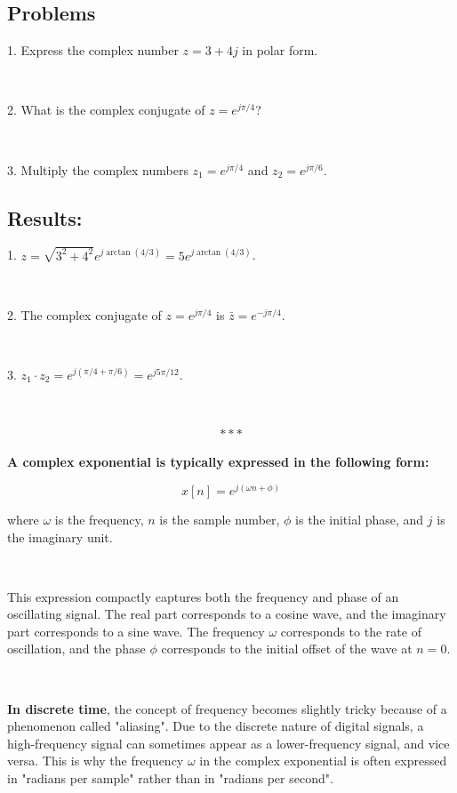 \documentclass[11pt]{article}
\begin{document}
\subsection*{Problems}

1. Express the complex number $z = 3 + 4j$ in polar form.

\ 


2. What is the complex conjugate of $z = e^{j\pi/4}$?

\ 

3. Multiply the complex numbers $z_1 = e^{j\pi/4}$ and $z_2 = e^{j\pi/6}$.

\subsection*{Results:}
1. $z = \sqrt{3^2 + 4^2}e^{j\arctan(4/3)} = 5e^{j\arctan(4/3)}$.

\ 


2. The complex conjugate of $z = e^{j\pi/4}$ is $\bar{z} = e^{-j\pi/4}$.

\ 

3. $z_1 \cdot z_2 = e^{j(\pi/4 + \pi/6)} = e^{j5\pi/12}$.



\ 

\begin{align*}
    ***
\end{align*}

\textbf{A complex exponential is typically expressed in the following form:}

\[
x[n] = e^{j(\omega n + \phi)}
\]


 
where $\omega$ is the frequency, $n$ is the sample number, $\phi$ is the initial phase, and $j$ is the imaginary unit.

\ 


This expression compactly captures both the frequency and phase of an oscillating signal. The real part corresponds to a cosine wave, and the imaginary part corresponds to a sine wave. The frequency $\omega$ corresponds to the rate of oscillation, and the phase $\phi$ corresponds to the initial offset of the wave at $n = 0$.

\ 

\textbf{In discrete time}, the concept of frequency becomes slightly tricky because of a phenomenon called "aliasing". Due to the discrete nature of digital signals, a high-frequency signal can sometimes appear as a lower-frequency signal, and vice versa. This is why the frequency $\omega$ in the complex exponential is often expressed in "radians per sample" rather than in "radians per second".
\end{document}
